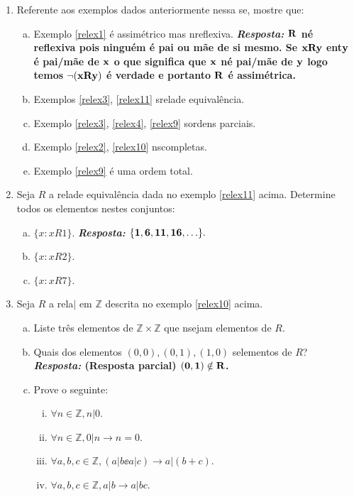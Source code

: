 \begin{enumerate}[{\bf 1.}]
\item Referente aos exemplos dados anteriormente nessa se\caoi, mostre que:
\begin{enumerate}[a)]
\item Exemplo \ref{relex1} \'e assim\'etrico mas n\ao reflexiva. {\bf{\it Resposta:} ${\bf R}$ n\ao \'e reflexiva pois ningu\'em \'e pai ou m\~ae de si mesmo. Se ${\bf xRy}$ ent\ao ${\bf y}$  \'e pai/m\~ae de ${\bf x}$ o que significa que ${\bf x}$ n\ao \'e pai/m\~ae de ${\bf y}$ logo temos ${\bf \lnot(xRy)}$ \'e verdade e portanto ${\bf R}$ \'e assim\'etrica.} 
\item Exemplos \ref{relex3}, \ref{relex11} s\ao rela\coes de equival\^encia.
\item Exemplo \ref{relex3}, \ref{relex4}, \ref{relex9} s\ao ordens parciais.
\item Exemplo \ref{relex2}, \ref{relex10} n\ao s\ao completas.
\item Exemplo \ref{relex9} \'e uma ordem total.
\end{enumerate}

\item Seja $R$ a rela\cao de equival\^encia dada no exemplo \ref{relex11} acima. Determine todos os elementos nestes conjuntos:
\begin{enumerate}[a)]
\item $\{x:xR1\}$. {\bf{\it Resposta:} ${\bf \{1,6,11,16,\ldots\}}.$}
\item $\{x:xR2\}$.
\item $\{x:xR7\}$.
\end{enumerate}

\item Seja $R$ a rela\cao $|$ em $\mathbb{Z}$ descrita no exemplo \ref{relex10} acima.
\begin{enumerate}[a)]
\item Liste tr\^es elementos de $\mathbb{Z}\times\mathbb{Z}$ que n\ao sejam elementos de $R$.
\item Quais dos elementos $(0,0),(0,1),(1,0)$ s\ao elementos de $R$? {\bf{\it Resposta:} (Resposta parcial) ${\bf (0,1)\notin R}$.}
\item Prove o seguinte:
\begin{enumerate}[i)]
\item $\forall n\in \mathbb{Z}, n|0$.
\item $\forall n\in \mathbb{Z}, 0|n\to n=0$. 
\item $\forall a,b,c\in \mathbb{Z}, (a|b\ee a|c)\to a|(b+c)$.
\item $\forall a,b,c\in \mathbb{Z}, a|b\to a|bc$.
\end{enumerate}
\end{enumerate}


\end{enumerate}

